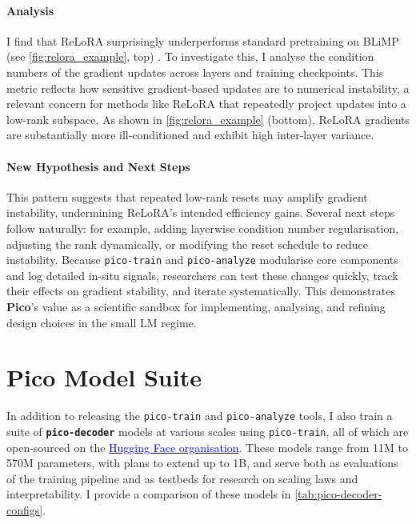 \paragraph{Analysis} I find that ReLoRA surprisingly underperforms standard pretraining on BLiMP (see \cref{fig:relora_example}, top) \citep{warstadt2020blimp}. To investigate this, I analyse the condition numbers of the gradient updates across layers and training checkpoints. This metric reflects how sensitive gradient-based updates are to numerical instability, a relevant concern for methods like ReLoRA that repeatedly project updates into a low-rank subspace. As shown in \cref{fig:relora_example} (bottom), ReLoRA gradients are substantially more ill-conditioned and exhibit high inter-layer variance. 


\paragraph{New Hypothesis and Next Steps}
This pattern suggests that repeated low-rank resets may amplify gradient instability, undermining ReLoRA's intended efficiency gains. Several next steps follow naturally: for example, adding layerwise condition number regularisation, adjusting the rank dynamically, or modifying the reset schedule to reduce instability. Because \texttt{pico-train} and \texttt{pico-analyze} modularise core components and log detailed in-situ signals, researchers can test these changes quickly, track their effects on gradient stability, and iterate systematically. This demonstrates \textbf{Pico}'s value as a scientific sandbox for implementing, analysing, and refining design choices in the small LM regime.


\section{Pico Model Suite}

In addition to releasing the \texttt{pico-train} and \texttt{pico-analyze} tools, I also train a suite of \textbf{\texttt{pico-decoder}} models at various scales using \texttt{pico-train}, all of which are open-sourced on the \href{https://huggingface.co/pico-lm}{\textcolor{blue}{Hugging Face organisation}}. These models range from 11M to 570M parameters, with plans to extend up to 1B, and serve both as evaluations of the training pipeline and as testbeds for research on scaling laws and interpretability. I provide a comparison of these models in \cref{tab:pico-decoder-configs}.


